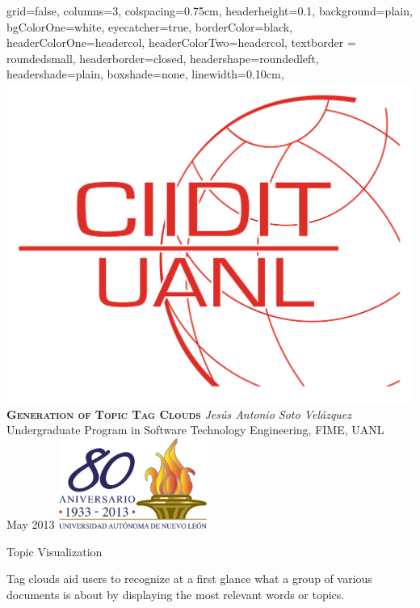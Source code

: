 \documentclass[a0paper, portrait]{baposter}
\begin{document}
\sffamily
\begin{poster}{
    grid=false,
    columns=3,
    colspacing=0.75cm, %
    headerheight=0.1\textheight,
    background=plain,
    bgColorOne=white,
    eyecatcher=true,
    borderColor=black,
    headerColorOne=headercol,
    headerColorTwo=headercol,
    textborder = roundedsmall,
    headerborder=closed,
    headershape=roundedleft,
    headershade=plain,
    boxshade=none,
    linewidth=0.10cm,
}
  { \includegraphics[height=0.1\textheight]{ciidit.png} }
  {\bf\textsc{Generation of Topic Tag Clouds}} 
  {
    {\it Jes\'us Antonio Soto Vel\'azquez} \\
    \small {
    Undergraduate Program in Software Technology Engineering, FIME, UANL \\
    May 2013        
    }
  }
  {
    \includegraphics[height=8.0em]{uanl.png}
  }


  \begin{posterbox}[name=intro, column=0, row=0]{Topic Visualization} {
    Tag clouds aid users to recognize at a first glance what a group of various documents is about by displaying the most relevant words or topics.
    
}
\end{posterbox}
\end{poster}
\end{document}
